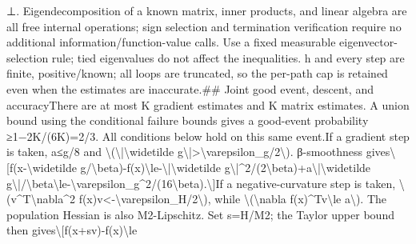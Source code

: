 \documentclass[10pt,a4paper]{article}
\begin{document}
{\AtlasUnicodeSymbols ⊥}\allowbreak{}. Eigendecomposition of a known matrix,\allowbreak{} inner products,\allowbreak{} and linear algebra are all free internal operations;\allowbreak{} sign selection and termination verification require no additional information/\allowbreak{}function-value calls. Use a fixed measurable eigenvector-selection rule;\allowbreak{} tied eigenvalues do not affect the inequalities. h and every step are finite,\allowbreak{} positive/\allowbreak{}known;\allowbreak{} all loops are truncated,\allowbreak{} so the per-path cap is retained even when the estimates are inaccurate.\newline{}\newline{}\#\# Joint good event,\allowbreak{} descent,\allowbreak{} and accuracy\newline{}\newline{}There are at most K gradient estimates and K matrix estimates. A union bound using the conditional failure bounds gives a good-event probability {\AtlasUnicodeSymbols ≥}\allowbreak{}1{\AtlasUnicodeSymbols −}\allowbreak{}2K/\allowbreak{}(6K)=\allowbreak{}2/\allowbreak{}3. All conditions below hold on this same event.\newline{}\newline{}If a gradient step is taken,\allowbreak{} a{\AtlasUnicodeSymbols ≤}\allowbreak{}g/\allowbreak{}8 and \textbackslash{}(\textbackslash{}|\textbackslash{}widetilde g\textbackslash{}|>\textbackslash{}varepsilon\_\allowbreak{}g/\allowbreak{}2\textbackslash{}). {\AtlasUnicodeText β}\allowbreak{}-smoothness gives\newline{}\textbackslash{}[\newline{}f(x-\textbackslash{}widetilde g/\allowbreak{}\textbackslash{}beta)-f(x)\newline{}\textbackslash{}le-\textbackslash{}|\textbackslash{}widetilde g\textbackslash{}|\textasciicircum{}2/\allowbreak{}(2\textbackslash{}beta)+a\textbackslash{}|\textbackslash{}widetilde g\textbackslash{}|/\allowbreak{}\textbackslash{}beta\newline{}\textbackslash{}le-\textbackslash{}varepsilon\_\allowbreak{}g\textasciicircum{}2/\allowbreak{}(16\textbackslash{}beta).\newline{}\textbackslash{}]\newline{}\newline{}If a negative-curvature step is taken,\allowbreak{} \textbackslash{}(v\textasciicircum{}T\textbackslash{}nabla\textasciicircum{}2 f(x)v<-\textbackslash{}varepsilon\_\allowbreak{}H/\allowbreak{}2\textbackslash{}),\allowbreak{} while \textbackslash{}(\textbackslash{}nabla f(x)\textasciicircum{}Tv\textbackslash{}le a\textbackslash{}). The population Hessian is also M2-Lipschitz. Set s=\allowbreak{}H/\allowbreak{}M2;\allowbreak{} the Taylor upper bound then gives\newline{}\textbackslash{}[\newline{}f(x+sv)-f(x)\textbackslash{}le 
\end{document}
